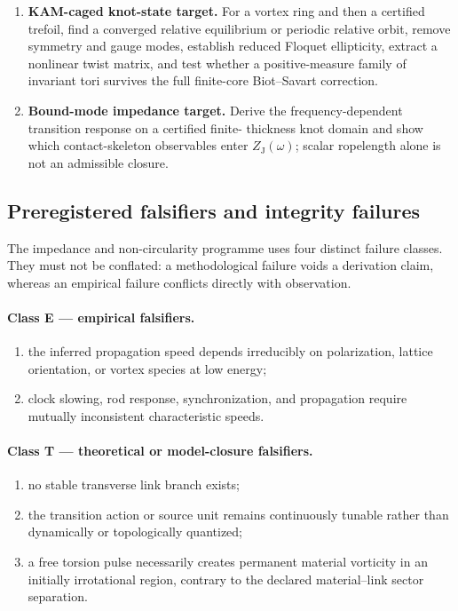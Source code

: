 \documentclass[11pt]{article}
\theoremstyle{definition}
\theoremstyle{plain}
\theoremstyle{remark}
\begin{document}
\begin{enumerate}
    \item \textbf{KAM-caged knot-state target.}
    For a vortex ring and then a certified trefoil, find a converged relative
    equilibrium or periodic relative orbit, remove symmetry and gauge modes,
    establish reduced Floquet ellipticity, extract a nonlinear twist matrix,
    and test whether a positive-measure family of invariant tori survives the
    full finite-core Biot--Savart correction.

    \item \textbf{Bound-mode impedance target.}
    Derive the frequency-dependent transition response on a certified finite-
    thickness knot domain and show which contact-skeleton observables enter
    $Z_{\mathrm J}(\omega)$; scalar ropelength alone is not an admissible closure.
\end{enumerate}

\subsection{Preregistered falsifiers and integrity failures}
\label{subsec:genesis_preregistered_falsifiers}

The impedance and non-circularity programme uses four distinct failure classes.
They must not be conflated: a methodological failure voids a derivation claim,
whereas an empirical failure conflicts directly with observation.

\paragraph{Class E --- empirical falsifiers.}
\begin{enumerate}
    \item the inferred propagation speed depends irreducibly on polarization,
    lattice orientation, or vortex species at low energy;
    \item clock slowing, rod response, synchronization, and propagation require
    mutually inconsistent characteristic speeds.
\end{enumerate}

\paragraph{Class T --- theoretical or model-closure falsifiers.}
\begin{enumerate}
    \item no stable transverse link branch exists;
    \item the transition action or source unit remains continuously tunable
    rather than dynamically or topologically quantized;
    \item a free torsion pulse necessarily creates permanent material vorticity
    in an initially irrotational region, contrary to the declared material--link
    sector separation.
\end{enumerate}
\end{document}
